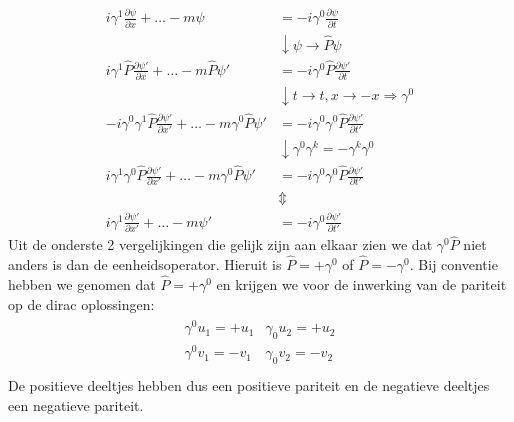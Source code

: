 \documentclass[../main.tex]{subfiles}
\begin{document}
\begin{equation}
    \begin{aligned}
        \label{eq:dirac_par}
        i\gamma^1 \frac{\partial \psi}{\partial x} + \dotsc -m\psi &= -i\gamma^0 \frac{\partial \psi}{\partial t} \\
                                                                   &\downarrow \psi \rightarrow \hat{P}\psi\\
        i\gamma^1 \hat{P} \frac{\partial \psi'}{\partial x} + \dotsc -m \hat{P} \psi' &= -i\gamma^0 \hat{P} \frac{\partial \psi'}{\partial t} \\
                                                                                      &\downarrow t\rightarrow t, x\rightarrow -x \Rightarrow \gamma^0\\
        -i\gamma^0\gamma^1 \hat{P} \frac{\partial \psi'}{\partial x'} + \dotsc -m \gamma^0 \hat{P} \psi' &= -i\gamma^0\gamma^0 \hat{P} \frac{\partial \psi'}{\partial t'} \\
                                                                                                         &\downarrow \gamma^0\gamma^k = -\gamma^k\gamma^0\\
        i\gamma^1\gamma^0 \hat{P} \frac{\partial \psi'}{\partial x'} + \dotsc -m \gamma^0 \hat{P} \psi' &= -i\gamma^0\gamma^0 \hat{P} \frac{\partial \psi'}{\partial t'} \\
                                                                                                       &\Updownarrow\\
        i\gamma^1 \frac{\partial \psi'}{\partial x'} + \dotsc -m\psi' &= -i\gamma^0 \frac{\partial \psi'}{\partial t'} 
    \end{aligned}
\end{equation}
Uit de onderste 2 vergelijkingen die gelijk zijn aan elkaar zien we dat $\gamma^0 \hat{P}$ niet anders is dan de eenheidsoperator. Hieruit is $\hat{P}=+\gamma^0$ of $\hat{P}=-\gamma^0$. Bij conventie hebben we genomen dat $\hat{P}=+\gamma^0$ en krijgen we voor de inwerking van de pariteit op de dirac oplossingen:
\begin{equation}
    \begin{aligned}
        \label{eq:par_dirac_opl}
        \begin{matrix}
            \gamma^0u_1 = +u_1 & \gamma_0u_2 = +u_2 \\
            \gamma^0v_1 = -v_1 & \gamma_0v_2 = -v_2 \\
        \end{matrix}
    \end{aligned}
\end{equation}
De positieve deeltjes hebben dus een positieve pariteit en de negatieve deeltjes een negatieve pariteit.
\end{document}
